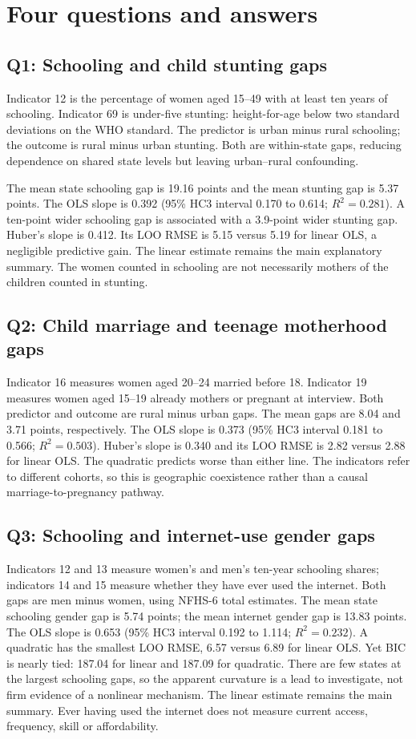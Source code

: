 \documentclass[11pt,a4paper]{article}
\begin{document}
\section{Four questions and answers}

\subsection{Q1: Schooling and child stunting gaps}
Indicator 12 is the percentage of women aged 15--49 with at least ten
years of schooling. Indicator 69 is under-five stunting: height-for-age
below two standard deviations on the WHO standard. The predictor is
urban minus rural schooling; the outcome is rural minus urban stunting.
Both are within-state gaps, reducing dependence on shared state levels
but leaving urban--rural confounding.

The mean state schooling gap is 19.16 points and the mean stunting gap
is 5.37 points. The OLS slope is 0.392 (95\% HC3 interval 0.170 to
0.614; $R^2=0.281$). A ten-point wider schooling gap is associated
with a 3.9-point wider stunting gap. Huber's slope is 0.412. Its
LOO RMSE is 5.15 versus 5.19 for linear OLS, a negligible predictive
gain. The linear estimate remains the main explanatory summary.
The women counted in schooling are not necessarily mothers of the
children counted in stunting.

\subsection{Q2: Child marriage and teenage motherhood gaps}
Indicator 16 measures women aged 20--24 married before 18. Indicator
19 measures women aged 15--19 already mothers or pregnant at interview.
Both predictor and outcome are rural minus urban gaps. The mean gaps
are 8.04 and 3.71 points, respectively. The OLS slope is 0.373
(95\% HC3 interval 0.181 to 0.566; $R^2=0.503$). Huber's slope
is 0.340 and its LOO RMSE is 2.82 versus 2.88 for linear OLS.
The quadratic predicts worse than either line. The indicators refer
to different cohorts, so this is geographic coexistence rather than
a causal marriage-to-pregnancy pathway.

\subsection{Q3: Schooling and internet-use gender gaps}
Indicators 12 and 13 measure women's and men's ten-year schooling
shares; indicators 14 and 15 measure whether they have ever used the
internet. Both gaps are men minus women, using NFHS-6 total estimates.
The mean state schooling gender gap is 5.74 points; the mean internet
gender gap is 13.83 points. The OLS slope is 0.653 (95\% HC3 interval
0.192 to 1.114; $R^2=0.232$). A quadratic has the smallest LOO RMSE,
6.57 versus 6.89 for linear OLS. Yet BIC is nearly tied: 187.04 for
linear and 187.09 for quadratic. There are few states at the largest
schooling gaps, so the apparent curvature is a lead to investigate,
not firm evidence of a nonlinear mechanism. The linear estimate remains
the main summary. Ever having used the internet does not measure
current access, frequency, skill or affordability.
\end{document}
